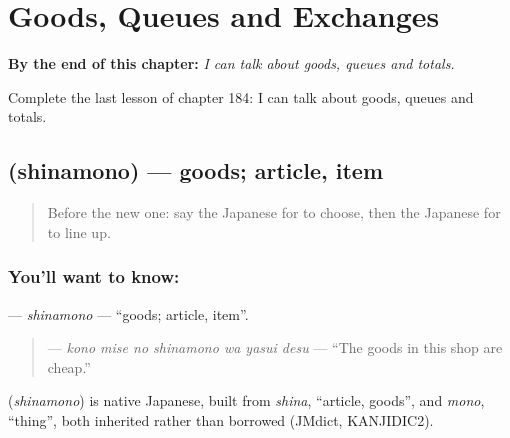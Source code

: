 
\chapter{Goods, Queues and Exchanges}
\label{ch:ja-goods-queues-and-exchanges}

\begin{chapteropening}
\textbf{By the end of this chapter:} \emph{I can talk about goods, queues and totals.}

Complete the last lesson of chapter 184: I can talk about goods, queues and totals.
\end{chapteropening}

\section[\texorpdfstring{\ja{しなもの} (shinamono)}{しなもの (shinamono)}]{ (shinamono) — goods; article, item}

\label{lesson:JA-C184-shinamono}



\begin{quote}
Before the new one: say the Japanese for to choose, then the Japanese for to line up.
\end{quote}

\subsection*{You'll want to know: }
\textbf{} — \emph{shinamono} — \textquotedblleft{}goods; article, item\textquotedblright{}.

\begin{quote}
\textbf{   } — \emph{kono mise no shinamono wa yasui desu} — \textquotedblleft{}The goods in this shop are cheap.\textquotedblright{}
\end{quote}

\begin{cousinweb}
\textbf{} (\emph{shinamono}) is native Japanese, built from \emph{shina}, \textquotedblleft{}article, goods\textquotedblright{}, and \emph{mono}, \textquotedblleft{}thing\textquotedblright{}, both inherited rather than borrowed (JMdict, KANJIDIC2).
\end{cousinweb}

